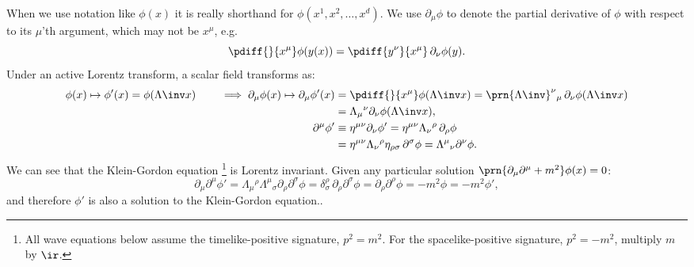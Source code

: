 \documentclass[11pt]{article}
\begin{document}
When we use notation like \(\phi(x)\) it is really shorthand for \(\phi(x^1,x^2,\ldots,x^d)\).
We use \(\partial_\mu\phi\) to denote the partial derivative of \(\phi\) with respect to its \(\mu\)'th argument, which may not be \(x^\mu\), e.g.
%
\begin{equation*}
  \pdiff{}{x^\mu} \phi(y(x)) = \pdiff{y^\nu}{x^\mu} \, \partial_\nu \phi(y).
\end{equation*}
%
Under an active Lorentz transform, a scalar field transforms as:
%
\begin{equation*}
\begin{aligned}
  \phi(x) \mapsto \phi'(x) = \phi(\Lambda\inv x)
  \qquad \implies
  \partial_\mu \phi(x) \mapsto \partial_\mu \phi'(x) 
    &= \pdiff{}{x^\mu} \phi(\Lambda\inv x)
    = \prn{\Lambda\inv}^\nu{}_\mu\, \partial_\nu \phi(\Lambda\inv x) \\
    &= \Lambda_\mu{}^\nu \partial_\nu \phi(\Lambda\inv x), \\
  \partial^\mu \phi' 
    &\equiv \eta^{\mu\nu} \partial_\nu \phi'
    = \eta^{\mu\nu} \Lambda_\nu{}^\rho\, \partial_\rho \phi \\
    &= \eta^{\mu\nu} \Lambda_\nu{}^\rho \eta_{\rho\sigma}\, \partial^\sigma \phi 
    = \Lambda^\mu{}_\nu \partial^\nu \phi.
\end{aligned}
\end{equation*}
%
We can see that the Klein-Gordon equation%
\footnote{All wave equations below assume the timelike-positive signature, \(p^2 = m^2\).
For the spacelike-positive signature, \(p^2 = - m^2\), multiply \(m\) by \(\ir\).} 
is Lorentz invariant.
Given any particular solution \(\prn{\partial_\mu \partial^\mu + m^2} \phi(x) = 0\):
%
\begin{equation}\label{eq:kleingordoninvt}
  \partial_\mu \partial^\mu \phi' 
    = \Lambda_\mu{}^\rho \Lambda^\mu{}_\sigma \partial_\rho \partial^\sigma \phi 
    = \delta^\rho_\sigma\, \partial_\rho \partial^\sigma \phi
    = \partial_\rho \partial^\rho \phi
    = -m^2 \phi
    = -m^2 \phi',
\end{equation}
%
and therefore \(\phi'\) is also a solution to the Klein-Gordon equation..
\end{document}

